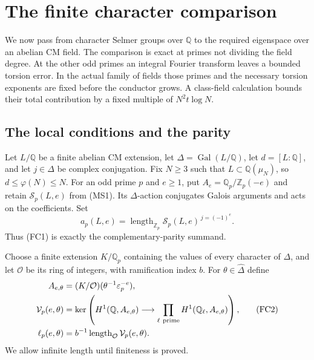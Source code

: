 \section{The finite character comparison}
\label{fcmp-section}

We now pass from character Selmer groups over $\mathbb Q$ to
the required eigenspace over an abelian CM field. The comparison
is exact at primes not dividing the field degree. At the other
odd primes an integral Fourier transform leaves a bounded
torsion error. In the actual family of fields those primes and
the necessary torsion exponents are fixed before the conductor
grows. A class-field calculation bounds their total contribution
by a fixed multiple of $N^2t\log N$.

\subsection{The local conditions and the parity}

Let $L/\mathbb Q$ be a finite abelian CM extension, let
$\Delta=\operatorname{Gal}(L/\mathbb Q)$, let
$d=[L:\mathbb Q]$, and let $j\in\Delta$ be complex
conjugation. Fix $N\ge3$ such that
$L\subset\mathbb Q(\mu_N)$, so $d\le\varphi(N)\le N$.
For an odd prime $p$ and $e\ge1$, put
$A_e=\mathbb Q_p/\mathbb Z_p(-e)$ and retain
$\mathcal S_p(L,e)$ from (MS1). Its $\Delta$-action
conjugates Galois arguments and acts on the coefficients.
Set
\[
 a_p(L,e)=\operatorname{length}_{\mathbb Z_p}
                  \mathcal S_p(L,e)^{\,j=(-1)^e}.
                                                               \tag{FC1}
\]
Thus (FC1) is exactly the complementary-parity summand.

Choose a finite extension $K/\mathbb Q_p$ containing the
values of every character of $\Delta$, and let $\mathcal O$
be its ring of integers, with ramification index $b$.
For $\theta\in\widehat\Delta$ define
\[
 \begin{split}
 A_{e,\theta}&=(K/\mathcal O)
                         (\theta^{-1}\varepsilon_p^{-e}),\\
 \mathcal V_p(e,\theta)
   &=\ker\left(H^1(\mathbb Q,A_{e,\theta})
              \longrightarrow\prod_{\ell\ {\rm prime}}
                         H^1(\mathbb Q_\ell,A_{e,\theta})\right),\\
 \ell_p(e,\theta)&=b^{-1}
       \operatorname{length}_{\mathcal O}\mathcal V_p(e,\theta).
 \end{split}                                                   \tag{FC2}
\]
We allow infinite length until finiteness is proved.

